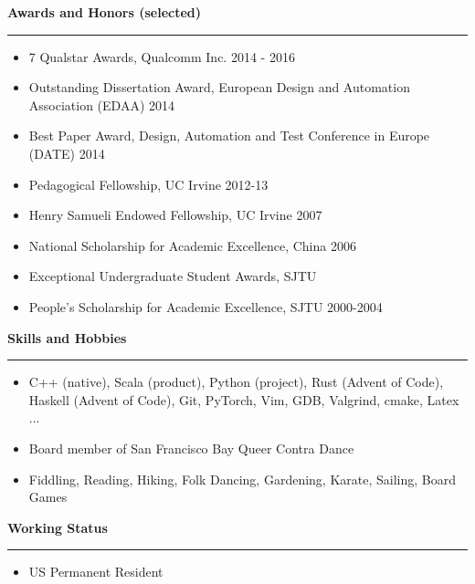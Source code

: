 \documentclass[10pt,A4]{article}
\newcommand{\cvsection}[1]
{
	\begin{flushleft}
  \LARGE\textcolor{sectcol}{\textbf{  #1}}
	\end{flushleft}
  \vspace{-15pt}
  \textcolor{softcol}{\hrule}
  \vspace{8pt}
}
\newcommand{\mystrut}{\rule[-.3\baselineskip]{0pt}{\baselineskip}}
\begin{document}
\cvsection{Awards and Honors (selected)}
\vspace{-4pt}
\begin{itemize}
 \setlength\itemsep{-0.1cm}
 \item 7 Qualstar Awards, Qualcomm Inc. 2014 - 2016
 \item Outstanding Dissertation Award, European Design and Automation Association (EDAA) 2014
 \item Best Paper Award, Design, Automation and Test Conference in Europe (DATE) 2014
 \item Pedagogical Fellowship, UC Irvine 2012-13
 \item Henry Samueli Endowed Fellowship, UC Irvine 2007
 \item National Scholarship for Academic Excellence, China 2006
 \item Exceptional Undergraduate Student Awards, SJTU
 \item People's Scholarship for Academic Excellence, SJTU 2000-2004
\end{itemize}

\cvsection{Skills and Hobbies}
\vspace{-4pt}
\begin{itemize}
 \setlength\itemsep{-0.1cm}
 \item C++ (native), Scala (product), Python (project), Rust (Advent of Code), Haskell (Advent of Code),  Git, PyTorch, Vim, GDB, Valgrind, cmake, Latex ...
 \item Board member of San Francisco Bay Queer Contra Dance
 \item Fiddling, Reading, Hiking, Folk Dancing, Gardening, Karate, Sailing, Board Games
\end{itemize}

\cvsection{Working Status}
\vspace{-4pt}
\begin{itemize}
 \item US Permanent Resident
\end{itemize}







%
%
%
%
%
%
\end{document}
